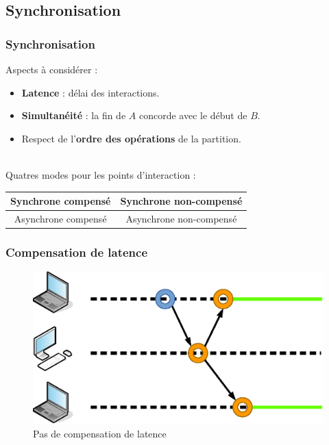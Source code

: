 \documentclass[handout]{beamer}
\begin{document}
\subsection{Synchronisation}
\begin{frame}
\frametitle{Synchronisation}
\Large
Aspects à considérer : 
\large
\begin{itemize}
	\item \textbf{Latence} : délai des interactions.
	\item \textbf{Simultanéité} : la fin de $A$ concorde avec le début de $B$.
	\item Respect de l'\textbf{ordre des opérations} de la partition.
\end{itemize}
~\\
\Large Quatres modes pour les points d'interaction : 
\large
\begin{table}
	\begin{tabular}{c|c}
	Synchrone compensé & Synchrone non-compensé \\
	\midrule
	Asynchrone compensé & Asynchrone non-compensé
	\end{tabular}
\end{table}

\end{frame}

\begin{frame}
\frametitle{Compensation de latence}
\begin{figure}
	\centering
	\includegraphics[width=\textwidth]{draw/noncompensated.eps}
	\caption{Pas de compensation de latence}
\end{figure}
\end{frame}
\end{document}
